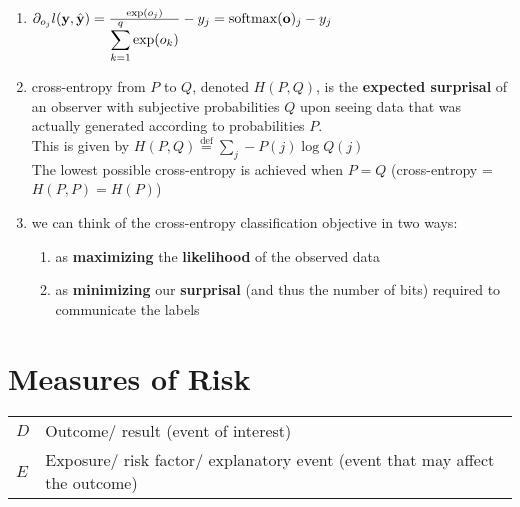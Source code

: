 \begin{enumerate}[itemsep=0.2cm]
    \item $
        \partial_{o_j} l(\mathbf{y}, \hat{\mathbf{y}}) 
        = \frac{\exp(o_j)}{\displaystyle\sum_{k=1}^q \exp(o_k)} - y_j 
        = \mathrm{softmax}(\mathbf{o})_j - y_j
    $

    \item cross-entropy from $P$ to $Q$, denoted $H(P, Q)$, is the \textbf{expected surprisal} of an observer with subjective probabilities $Q$ upon seeing data that was actually generated according to probabilities $P$.\\
    This is given by $H(P, Q) \stackrel{\textrm{def}}{=} \sum_j - P(j) \log Q(j)$\\
    The lowest possible cross-entropy is achieved when $P=Q$ (cross-entropy = $H(P,P)=H(P)$)


    \item we can think of the cross-entropy classification objective in two ways: 
    \begin{enumerate}
        \item as \textbf{maximizing} the \textbf{likelihood} of the observed data
        
        \item as \textbf{minimizing} our \textbf{surprisal} (and thus the number of bits) required to communicate the labels
    \end{enumerate}

\end{enumerate}




\section{Measures of Risk \cite{ism-1}} \label{Measures of Risk}

\begin{customTableWrapper}{1.5}
\begin{table}[H]
    \centering
    \begin{tabular}{l p{7cm}}
        $D$ & Outcome/ result (event of interest) \\
        
        $E$ & Exposure/ risk factor/ explanatory event (event that may affect the outcome)\\
    \end{tabular}
\end{table}
\end{customTableWrapper}

